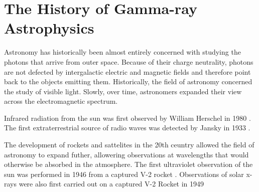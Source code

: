 
\section{The History of Gamma-ray Astrophysics}








Astronomy has historically been almost entirely concerned with studying
the photons that arrive from outer space.  Because of their charge
neutrality, photons are not defected by intergalactic electric and
magnetic fields and therefore point back to the objects 
emitting them. Historically, the field of astronomy concerned
the study of visible light.  Slowly, over time, astronomers 
expanded their view across the electromagnetic spectrum.

Infrared radiation from the sun was first observed by
William Herschel in 1980 \citep{herschel_1800_experiments-refrangibility}.
The first extraterrestrial source of radio waves was detected
by Jansky in 1933 \citep{jansky_1933_electrical-disturbances}.

The development of rockets and sattelites in the 20th ceuntry allowed
the field of astronomy to expand futher, allowering observations
at wavelengths that would otherwise be absorbed in the atmosphere.
The first ultraviolet observation of the sun was performed in 1946 from a
captured V-2 rocket \citep{baum_1946_ultraviolet-spectrum}.  Observations of
solar x-rays were also first carried out on a captured V-2 Rocket in
1949 \citep{burnight_1949_x-radiation-atmosphere}

